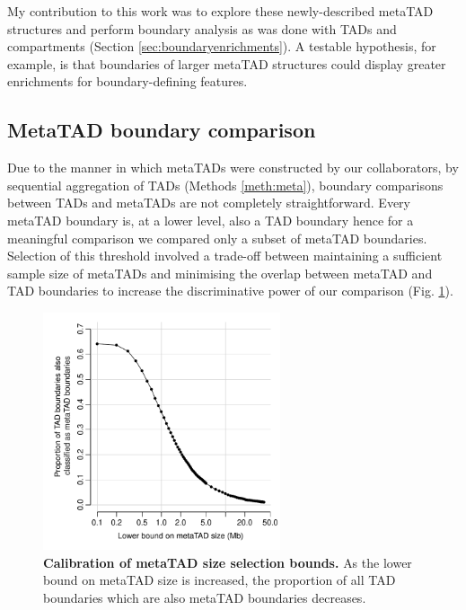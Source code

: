 \documentclass[a4paper,11pt,oneside]{book}
\begin{document}
My contribution to this work was to explore these newly-described metaTAD structures and perform boundary analysis as was done with TADs and compartments (Section \ref{sec:boundaryenrichments}). A testable hypothesis, for example, is that boundaries of larger metaTAD structures could display greater enrichments for boundary-defining features.

\subsection{MetaTAD boundary comparison}\label{sec:metaVtad}

Due to the manner in which metaTADs were constructed by our collaborators, by sequential aggregation of TADs (Methods \ref{meth:meta}), boundary comparisons between TADs and metaTADs are not completely straightforward. Every metaTAD boundary is, at a lower level, also a TAD boundary hence for a meaningful comparison we compared only a subset of metaTAD boundaries. Selection of this threshold involved a trade-off between maintaining a sufficient sample size of metaTADs and minimising the overlap between metaTAD and TAD boundaries to increase the discriminative power of our comparison (Fig. \ref{fig:mtcalibrate}).

\begin{figure}
\begin{center} 
\includegraphics[width=2.75in]{mt_calibrate.pdf}
\captionsetup{width=\textwidth}
\caption[Calibration of metaTAD size selection bounds.]{ {\bf Calibration of metaTAD size selection bounds. }
As the lower bound on metaTAD size is increased, the proportion of all TAD boundaries which are also metaTAD boundaries decreases.
}\label{fig:mtcalibrate}
\end{center}
\end{figure} 
\end{document}
